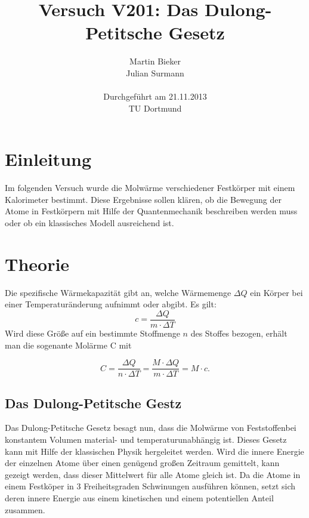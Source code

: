 \documentclass[11pt,ngerman,a4paper]{article}
\title{\textbf{Versuch V201: Das Dulong-Petitsche Gesetz}}
\author{Martin Bieker\\
		Julian Surmann\\
		\\
		Durchgef\"{u}hrt am 21.11.2013\\
		TU Dortmund}
\date{}
\begin{document}
\renewcommand\tablename{Tabelle}
\renewcommand\figurename{Abbildung}
\maketitle
\thispagestyle{empty}
\newpage
\clearpage
\setcounter{page}{1}


\section{Einleitung}

Im folgenden Versuch wurde die Molw\"arme verschiedener Festk\"orper mit einem Kalorimeter bestimmt.  Diese Ergebnisse sollen kl\"aren, ob die Bewegung der Atome in Festk\"orpern mit Hilfe der Quantenmechanik beschreiben werden muss oder ob ein klassisches Modell ausreichend ist.
\section{Theorie}

Die spezifische W\"armekapazit\"at gibt an, welche W\"armemenge $\Delta Q$ ein K\"orper bei einer Temperatur\"anderung aufnimmt oder abgibt. Es gilt:
\begin{equation}
c = \frac{\Delta Q}{m \cdot\Delta T}
\end{equation}
Wird diese Gr\"o\ss e auf ein bestimmte Stoffmenge $n$ des Stoffes bezogen, erh\"alt man die sogenante Mol\"arme C mit 

\begin{equation}
\label{c_w}
C = \frac{\Delta Q }{n\cdot \Delta T} =\frac{M\cdot \Delta Q}{m\cdot \Delta T} = M  \cdot c.
\end{equation}
\subsection{Das Dulong-Petitsche Gestz}
Das Dulong-Petitsche Gesetz besagt nun, dass die Molw\"arme von Feststoffenbei konstantem Volumen material- und temperaturunabh\"angig ist. Dieses Gesetz kann mit Hilfe der klassischen Physik hergeleitet werden.
Wird die innere Energie der einzelnen Atome \"uber einen gen\"ugend gro\ss en Zeitraum gemittelt, kann gezeigt werden, dass dieser Mittelwert f\"ur alle Atome gleich ist. Da die Atome in einem Festk\"oper in 3 Freiheitsgraden Schwinungen ausf\"uhren k\"onnen, setzt sich deren innere Energie aus einem kinetischen und einem potentiellen Anteil zusammen.
\end{document}
